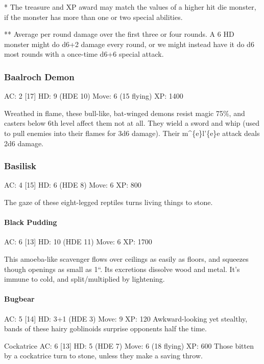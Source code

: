 * The treasure and XP award may match the values of a higher hit die
monster, if the monster has more than one or two special abilities.

** Average per round damage over the first three or four rounds. A 6 HD
monster might do d6+2 damage every round, or we might instead have it do
d6 most rounds with a once-time d6+6 special attack.

\subsubsection{Baalroch Demon}\label{baalroch-demon}

AC: 2 {[}17{]} HD: 9 (HDE 10) Move: 6 (15 flying) XP: 1400

Wreathed in flame, these bull-like, bat-winged demons resist magic 75\%,
and casters below 6th level affect them not at all. They wield a sword
and whip (used to pull enemies into their flames for 3d6 damage). Their
m\^{}\{e\}l'\{e\}e attack deals 2d6 damage.

\subsubsection{Basilisk}\label{basilisk}

AC: 4 {[}15{]} HD: 6 (HDE 8) Move: 6 XP: 800

The gaze of these eight-legged reptiles turns living things to stone.

\paragraph{Black Pudding}\label{black-pudding}

AC: 6 {[}13{]} HD: 10 (HDE 11) Move: 6 XP: 1700

This amoeba-like scavenger flows over ceilings as easily as floors, and
squeezes though openings as small as 1``. Its excretions dissolve wood
and metal. It's immune to cold, and split/multiplied by lightening.

\paragraph{Bugbear}\label{bugbear}

AC: 5 {[}14{]} HD: 3+1 (HDE 3) Move: 9 XP: 120 Awkward-looking yet
stealthy, bands of these hairy goblinoids surprise opponents half the
time.

Cockatrice AC: 6 {[}13{]} HD: 5 (HDE 7) Move: 6 (18 flying) XP: 600
Those bitten by a cockatrice turn to stone, unless they make a saving
throw.

